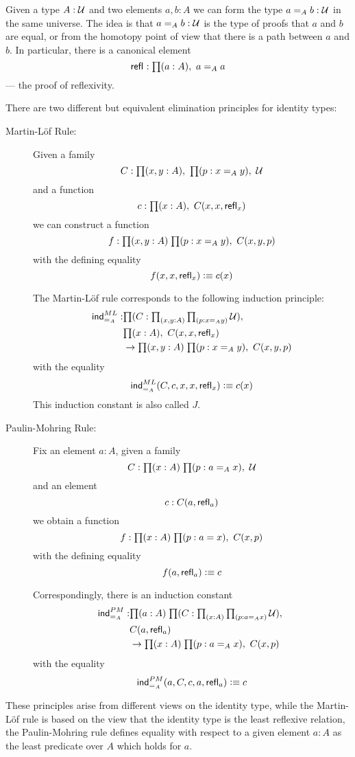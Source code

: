 Given a type $A:\mathcal{U}$ and two elements $a,b:A$ we can form the type $a=_A b:\mathcal{U}$ in the same universe. The idea is that $a=_A b:\mathcal{U}$ is the type of proofs that $a$ and $b$ are equal, or from the homotopy point of view that there is a path between $a$ and $b$. In particular, there is a canonical element
\[\refl{} : \prd{a:A} a =_A a\] --- the proof of reflexivity.

There are two different but equivalent elimination principles for
identity types:
\begin{description}
\item[Martin-L\"{o}f Rule:] 
Given a family 
\[ C : \prd{x,y:A}\prd{p:x =_A y} \UU \]
and a function
\[ c :  \prd{x:A} C(x,x,\refl{x})\]
we can construct a function
\[ f : \prd{x,y:A}{p:x =_A y} C(x,y,p) \]
with the defining equality 
\[ f(x,x,\mathsf{refl}_{x}) \vcentcolon\equiv c(x) \]

The Martin-L\"of rule corresponds to the following induction principle:
\begin{align*}
 \ind{=_A}^{ML} : & \prd{C : \prd{x,y:A}\prd{p:x =_A y} \UU}  \\
     & \prd{x:A} C(x,x,\refl{x})  \\
     & \to  \prd{x,y:A}{p:x =_A y} C(x,y,p)
\end{align*}
with the equality
\[ \mathsf{ind}_{=_A}^{ML}(C,c,x,x,\mathsf{refl}_{x}) \vcentcolon\equiv c(x) \]
This induction constant is also called $J$.

\item[Paulin-Mohring Rule:] 

Fix an element $a:A$, given a family
\[ C : \prd{x:A}{p : a =_A x} \UU \]
and an element
\[ c : C(a,\mathsf{refl}_{a}) \]
we obtain a function
\[ f : \prd{x:A}{p:a = x} C(x,p) \]
with the defining equality
\[ f(a,\mathsf{refl}_{a}) \vcentcolon\equiv c \]

Correspondingly, there is an induction constant
\begin{align*}
\ind{=_A}^{PM} : & \prd{a:A}{C : \prd{x:A}{p : a =_A x} \UU} \\
& C(a,\refl{a}) \\
& \to \prd{x:A}{p : a =_A x} C(x,p) 
\end{align*}
with the equality
\[ \mathsf{ind}_{=_A}^{PM}(a,C,c,a,\mathsf{refl}_{a}) \vcentcolon\equiv c \]
\end{description}
These principles arise from different views on the identity type,
while the Martin-L\"of rule is based on the view that the identity
type is the least reflexive relation, the Paulin-Mohring rule defines 
equality with respect to a given element $a:A$ as the least predicate
over $A$ which holds for $a$.

